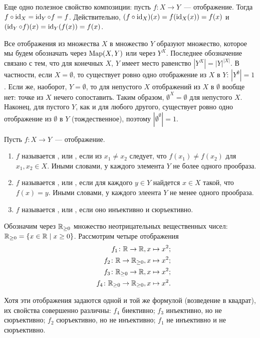 Еще одно полезное свойство композиции: пусть $f\colon X\to Y$~---
отображение. Тогда $f\circ\operatorname{id}_X=\operatorname{id}_Y\circ f=f$. Действительно,
$(f\circ\operatorname{id}_X)(x)=f(\operatorname{id}_X(x))=f(x)$ и $(\operatorname{id}_Y\circ
f)(x)=\operatorname{id}_Y(f(x))=f(x)$.

Все отображения из множества $X$ в множество $Y$ образуют множество,
которое мы будем обозначать через $\operatorname{Map}(X,Y)$ или через
$Y^X$. Последнее обозначение связано с тем, что для конечных $X$, $Y$
имеет место равенство $|Y^X|=|Y|^{|X|}$. В частности, если
$X=\emptyset$, то существует ровно одно отображение из $X$ в $Y$:
$|Y^\emptyset|=1$. Если же, наоборот, $Y=\emptyset$, то для непустого
$X$ отображений из $X$ в $\emptyset$ вообще нет: точке из $X$ нечего
сопоставить. Таким образом, $\emptyset^X=\emptyset$ для непустого
$X$. Наконец, для пустого $Y$, как и для любого другого,
существует ровно одно отображение из $\emptyset$ в $Y$
(тождественное), поэтому $|\emptyset^\emptyset|=1$.

\begin{definition}
Пусть $f\colon X\to Y$~--- отображение.
\begin{enumerate}
\item
$f$ называется , или
, если из
$x_1\neq x_2$ следует, что $f(x_1)\neq f(x_2)$ для $x_1,x_2\in
X$. Иными словами, у каждого элемента $Y$ не более одного прообраза.
\item
$f$ называется , или
, если
для каждого $y\in Y$ найдется $x\in X$ такой, что $f(x)=y$. Иными
словами, у каждого элеента $Y$ не менее одного прообраза.
\item
$f$ называется , или
, если
оно инъективно и сюръективно.
\end{enumerate}
\end{definition}

\begin{example}
Обозначим через $\mathbb R_{\geq 0}$ множество неотрицательных
вещественных чисел: $\mathbb R_{\geq 0}=\{x\in\mathbb R\mid x\geq
0\}$. Рассмотрим четыре отображения
\begin{eqnarray*}
&&f_1\colon\mathbb R\to\mathbb R, x\mapsto x^2;\\
&&f_2\colon\mathbb R\to\mathbb R_{\geq 0}, x\mapsto x^2;\\
&&f_3\colon\mathbb R_{\geq 0}\to\mathbb R, x\mapsto x^2;\\
&&f_4\colon\mathbb R_{\geq 0}\to\mathbb R_{\geq 0}, x\mapsto x^2.
\end{eqnarray*}
\end{example}
Хотя эти отображения задаются одной и той же формулой (возведение в
квадрат), их свойства совершенно различны: $f_4$ биективно; $f_3$
инъективно, но не сюръективно; $f_2$ сюръективно, но не инъективно;
$f_1$ не инъективно и не сюръективно.


